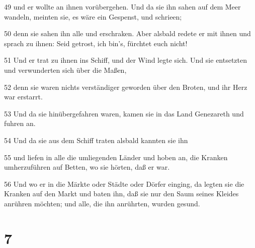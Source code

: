 \par 49 und er wollte an ihnen vorübergehen. Und da sie ihn sahen auf dem Meer wandeln, meinten sie, es wäre ein Gespenst, und schrieen;
\par 50 denn sie sahen ihn alle und erschraken. Aber alsbald redete er mit ihnen und sprach zu ihnen: Seid getrost, ich bin's, fürchtet euch nicht!
\par 51 Und er trat zu ihnen ins Schiff, und der Wind legte sich. Und sie entsetzten und verwunderten sich über die Maßen,
\par 52 denn sie waren nichts verständiger geworden über den Broten, und ihr Herz war erstarrt.
\par 53 Und da sie hinübergefahren waren, kamen sie in das Land Genezareth und fuhren an.
\par 54 Und da sie aus dem Schiff traten alsbald kannten sie ihn
\par 55 und liefen in alle die umliegenden Länder und hoben an, die Kranken umherzuführen auf Betten, wo sie hörten, daß er war.
\par 56 Und wo er in die Märkte oder Städte oder Dörfer einging, da legten sie die Kranken auf den Markt und baten ihn, daß sie nur den Saum seines Kleides anrühren möchten; und alle, die ihn anrührten, wurden gesund.

\chapter{7}

